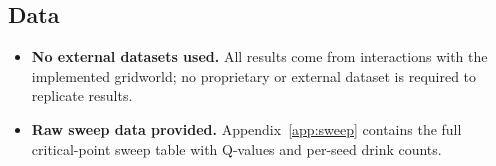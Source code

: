 \documentclass[manuscript, screen, review]{jair}
\begin{document}
\subsection*{Data}
\begin{itemize}[noitemsep]
  \item[\checkmark] \textbf{No external datasets used.}
    All results come from interactions with the implemented gridworld;
    no proprietary or external dataset is required to replicate results.
  \item[\checkmark] \textbf{Raw sweep data provided.}
    Appendix~\ref{app:sweep} contains the full critical-point sweep table
    with Q-values and per-seed drink counts.
\end{itemize}
\end{document}
